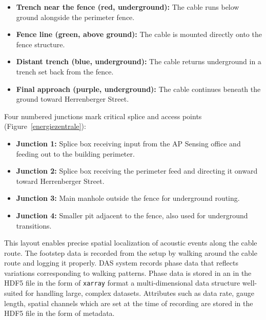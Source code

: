 \begin{itemize}
    \item \textbf{Trench near the fence (red, underground):}  
          The cable runs below ground alongside the perimeter fence.
    \item \textbf{Fence line (green, above ground):}  
          The cable is mounted directly onto the fence structure.
    \item \textbf{Distant trench (blue, underground):}  
          The cable returns underground in a trench set back from the fence.
    \item \textbf{Final approach (purple, underground):}  
          The cable continues beneath the ground toward Herrenberger Street.
\end{itemize}

Four numbered junctions mark critical splice and access points (Figure~\ref{energiezentrale}):

\begin{itemize}
    \item \textbf{Junction 1:} Splice box receiving input from the AP Sensing office and feeding out to the building perimeter.
    \item \textbf{Junction 2:} Splice box receiving the perimeter feed and directing it onward toward Herrenberger Street.
    \item \textbf{Junction 3:} Main manhole outside the fence for underground routing.
    \item \textbf{Junction 4:} Smaller pit adjacent to the fence, also used for underground transitions.
\end{itemize}

This layout enables precise spatial localization of acoustic events along the cable route. The footstep data is recorded from the setup by walking around the cable route and logging it properly. DAS system records phase data that reflects variations corresponding to walking patterns. Phase data is stored in an in the HDF5 file in the form of \texttt{xarray} format a multi-dimensional data structure well-suited for handling large, complex datasets. Attributes such as data rate, gauge length, spatial channels  which are set at the time of recording are stored in the HDF5 file in the form of metadata. 

